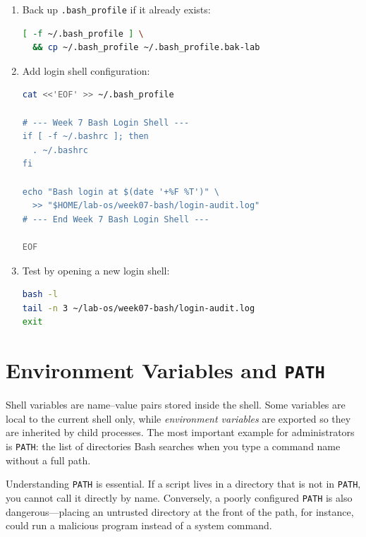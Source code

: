\begin{enumerate}
  \item Back up \texttt{.bash\_profile} if it already exists:
\begin{lstlisting}[language=bash, caption={Backing up .bash\_profile if present}]
[ -f ~/.bash_profile ] \
  && cp ~/.bash_profile ~/.bash_profile.bak-lab
\end{lstlisting}

  \item Add login shell configuration:
\begin{lstlisting}[language=bash, caption={Adding configuration to .bash\_profile}]
cat <<'EOF' >> ~/.bash_profile

# --- Week 7 Bash Login Shell ---
if [ -f ~/.bashrc ]; then
  . ~/.bashrc
fi

echo "Bash login at $(date '+%F %T')" \
  >> "$HOME/lab-os/week07-bash/login-audit.log"
# --- End Week 7 Bash Login Shell ---

EOF
\end{lstlisting}

  \item Test by opening a new login shell:
\begin{lstlisting}[language=bash, caption={Testing .bash\_profile with a login shell}]
bash -l
tail -n 3 ~/lab-os/week07-bash/login-audit.log
exit
\end{lstlisting}
\end{enumerate}

\section{Environment Variables and \texttt{PATH}}
\label{sec:env-variables-path}

Shell variables are name–value pairs stored inside the shell. Some variables
are local to the current shell only, while \textit{environment variables} are
exported so they are inherited by child processes. The most important example
for administrators is \texttt{PATH}: the list of directories Bash searches
when you type a command name without a full path.

Understanding \texttt{PATH} is essential. If a script lives in a directory
that is not in \texttt{PATH}, you cannot call it directly by name. Conversely,
a poorly configured \texttt{PATH} is also dangerous---placing an untrusted
directory at the front of the path, for instance, could run a malicious
program instead of a system command.

